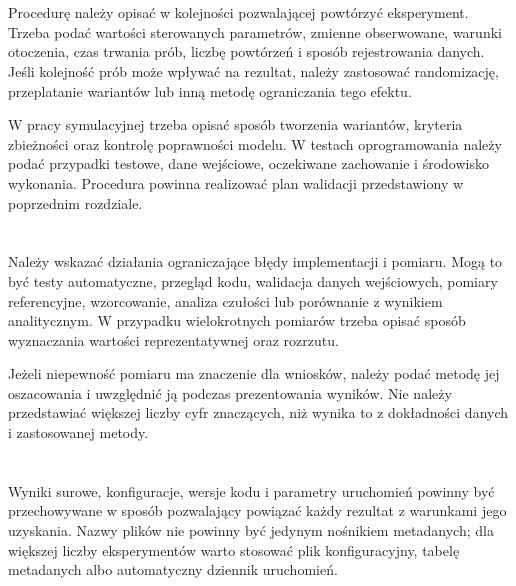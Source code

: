 \section{}

Procedurę należy opisać w kolejności pozwalającej powtórzyć eksperyment. Trzeba podać wartości sterowanych parametrów, zmienne obserwowane, warunki otoczenia, czas trwania prób, liczbę powtórzeń i sposób rejestrowania danych. Jeśli kolejność prób może wpływać na rezultat, należy zastosować randomizację, przeplatanie wariantów lub inną metodę ograniczania tego efektu.

W pracy symulacyjnej trzeba opisać sposób tworzenia wariantów, kryteria zbieżności oraz kontrolę poprawności modelu. W testach oprogramowania należy podać przypadki testowe, dane wejściowe, oczekiwane zachowanie i środowisko wykonania. Procedura powinna realizować plan walidacji przedstawiony w poprzednim rozdziale.

\section{}

Należy wskazać działania ograniczające błędy implementacji i pomiaru. Mogą to być testy automatyczne, przegląd kodu, walidacja danych wejściowych, pomiary referencyjne, wzorcowanie, analiza czułości lub porównanie z wynikiem analitycznym. W przypadku wielokrotnych pomiarów trzeba opisać sposób wyznaczania wartości reprezentatywnej oraz rozrzutu.

Jeżeli niepewność pomiaru ma znaczenie dla wniosków, należy podać metodę jej oszacowania i uwzględnić ją podczas prezentowania wyników. Nie należy przedstawiać większej liczby cyfr znaczących, niż wynika to z dokładności danych i zastosowanej metody.

\section{}

Wyniki surowe, konfiguracje, wersje kodu i parametry uruchomień powinny być przechowywane w sposób pozwalający powiązać każdy rezultat z warunkami jego uzyskania. Nazwy plików nie powinny być jedynym nośnikiem metadanych; dla większej liczby eksperymentów warto stosować plik konfiguracyjny, tabelę metadanych albo automatyczny dziennik uruchomień.

